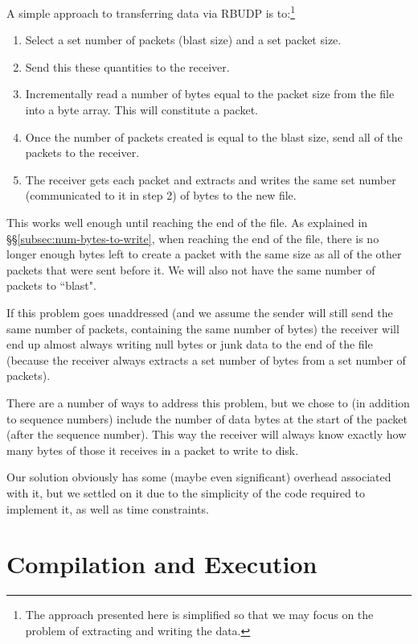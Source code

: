\documentclass[10pt, a4paper]{article}
\begin{document}
A simple approach to transferring data via RBUDP is to:\footnote{The approach
presented here is simplified so that we may focus on the problem of
extracting and writing the data.}
\begin{enumerate}
  \item Select a set number of packets (blast size) and a set packet size.
  \item Send this these quantities to the receiver.
  \item Incrementally read a number of bytes equal to the packet size from the
    file into a byte array. This will constitute a packet.
  \item Once the number of packets created is equal to the blast size, send all
    of the packets to the receiver.
  \item The receiver gets each packet and extracts and writes the same set
    number (communicated to it in step 2) of bytes to the new file.
\end{enumerate}
This works well enough until reaching the end of the file. As explained in
\S\S\ref{subsec:num-bytes-to-write}, when reaching the end of the file, there is
no longer enough bytes left to create a packet with the same size as all of the
other packets that were sent before it. We will also not have the same number of
packets to ``blast".

If this problem goes unaddressed (and we assume the sender
will still send the same number of packets, containing the same number of bytes)
the receiver will end up almost always writing null bytes or junk data to the
end of the file (because the receiver always extracts a set number of bytes
from a set number of packets).

There are a number of ways to address this problem, but we chose to (in addition
to sequence numbers) include the number of data bytes at the start of the packet
(after the sequence number). This way the receiver will always know exactly how
many bytes of those it receives in a packet to write to disk.

Our solution obviously has some (maybe even significant) overhead associated
with it, but we settled on it due to the simplicity of the code required to
implement it, as well as time constraints.


\section{Compilation and Execution}
\label{sec:comp-exec}
\end{document}
